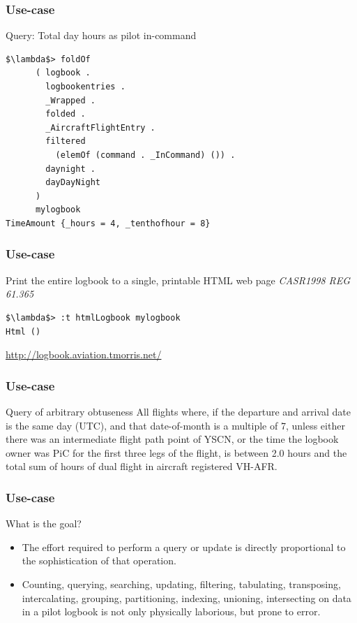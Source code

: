 \begin{frame}[fragile]
\frametitle{Use-case}
\begin{block}{Query: Total day hours as pilot in-command}
\begin{lstlisting}[style=haskell,basicstyle=\scriptsize\ttfamily,mathescape]
$\lambda$> foldOf
      ( logbook .
        logbookentries .
        _Wrapped .
        folded .
        _AircraftFlightEntry .
        filtered
          (elemOf (command . _InCommand) ()) .
        daynight .
        dayDayNight
      )
      mylogbook
TimeAmount {_hours = 4, _tenthofhour = 8}
\end{lstlisting}
\end{block}
\end{frame}

\begin{frame}[fragile]
\frametitle{Use-case}
\begin{block}{Print the entire logbook to a single, printable HTML web page \emph{CASR1998 REG 61.365}}
\begin{lstlisting}[style=haskell,mathescape]
$\lambda$> :t htmlLogbook mylogbook
Html ()
\end{lstlisting}
\end{block}
\href{http://logbook.aviation.tmorris.net/}{http://logbook.aviation.tmorris.net/}
\end{frame}

\begin{frame}[fragile]
\frametitle{Use-case}
\begin{block}{Query of arbitrary obtuseness}
All flights where, if the departure and arrival date is the same day (UTC), and that date-of-month is a multiple of 7, unless either there was an intermediate flight path point of YSCN, or the time the logbook owner was PiC for the first three legs of the flight, is between 2.0 hours and the total sum of hours of dual flight in aircraft registered VH-AFR.
\end{block}
\end{frame}

\begin{frame}[fragile]
\frametitle{Use-case}
\begin{block}{What is the goal?}
\begin{itemize}
\item<1-> The effort required to perform a query or update is directly proportional to the sophistication of that operation.
\item<2-> Counting, querying, searching, updating, filtering, tabulating, transposing, intercalating, grouping, partitioning, indexing, unioning, intersecting on data in a pilot logbook is not only physically laborious, but prone to error.
\end{itemize}

\end{block}
\end{frame}

